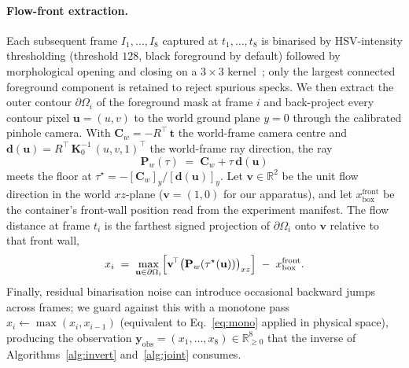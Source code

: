 \paragraph{Flow-front extraction.}
Each subsequent frame $I_{1}, \dots, I_{8}$ captured at
$t_{1}, \dots, t_{8}$
is binarised by HSV-intensity thresholding (threshold $128$, black
foreground by default) followed by morphological opening and closing
on a $3\times 3$ kernel~\cite{gonzalez2018digital}; only the largest
connected foreground component is retained to reject spurious
specks. We then extract the outer contour $\partial\Omega_{i}$ of
the foreground mask at frame $i$ and back-project every contour
pixel $\mathbf{u} = (u, v)$ to the world ground plane $y = 0$
through the calibrated pinhole camera. With
$\mathbf{C}_{w} = -R^{\!\top}\,\mathbf{t}$ the world-frame camera
centre and
$\mathbf{d}(\mathbf{u}) = R^{\!\top}\,\mathbf{K}_{0}^{-1}\,(u, v, 1)^{\!\top}$
the world-frame ray direction, the ray
\begin{equation}
\label{eq:backproj}
    \mathbf{P}_{w}(\tau)
    \;=\; \mathbf{C}_{w} + \tau\,\mathbf{d}(\mathbf{u})
\end{equation}
meets the floor at
$\tau^{\star} = -[\mathbf{C}_{w}]_{y}/[\mathbf{d}(\mathbf{u})]_{y}$.
Let $\mathbf{v} \in \mathbb{R}^{2}$ be the unit flow direction in
the world $xz$-plane ($\mathbf{v} = (1, 0)$ for our apparatus), and
let $x^{\mathrm{front}}_{\mathrm{box}}$ be the container's
front-wall position read from the experiment manifest. The flow
distance at frame $t_{i}$ is the farthest signed projection of
$\partial\Omega_{i}$ onto $\mathbf{v}$ relative to that front wall,
\begin{equation}
\label{eq:xi}
    x_{i} \;=\;
    \max_{\mathbf{u} \in \partial\Omega_{i}}
    \Bigl[\mathbf{v}^{\!\top}
          \bigl(\mathbf{P}_{w}(\tau^{\star}(\mathbf{u}))\bigr)_{xz}\Bigr]
    \;-\; x^{\mathrm{front}}_{\mathrm{box}}.
\end{equation}
Finally, residual binarisation noise can introduce occasional
backward jumps across frames; we guard against this with a monotone
pass $x_{i} \leftarrow \max(x_{i}, x_{i-1})$ (equivalent to
Eq.~\eqref{eq:mono} applied in physical space), producing the
observation
$\mathbf{y}_{\mathrm{obs}} = (x_{1}, \dots, x_{8})
\in \mathbb{R}_{\ge 0}^{8}$ that the inverse of
Algorithms~\ref{alg:invert} and~\ref{alg:joint} consumes.

